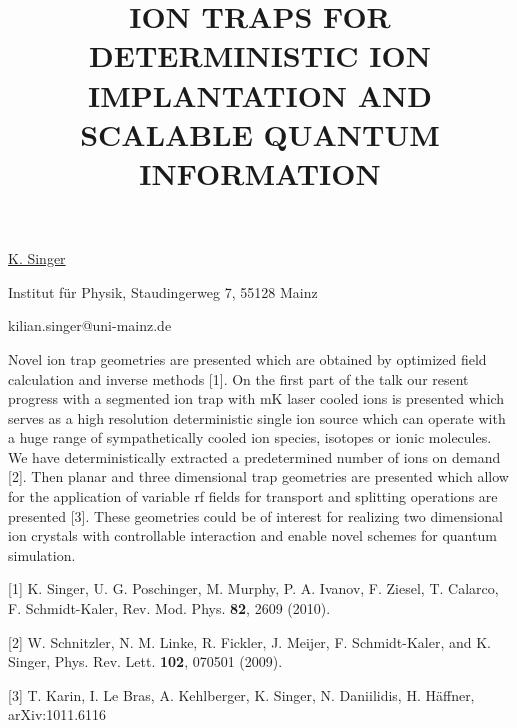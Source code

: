 \title{ION TRAPS FOR DETERMINISTIC ION IMPLANTATION AND SCALABLE QUANTUM INFORMATION}

\underline{K. Singer} 

{\normalsize{\vspace{-4mm}}
Institut f\"{u}r Physik, Staudingerweg 7, 55128 Mainz

\email kilian.singer@uni-mainz.de}

Novel ion trap geometries are presented which are obtained by optimized field calculation and inverse methods [1]. On the first part of the talk our resent progress with a segmented ion trap with mK laser cooled ions is presented which serves as a high resolution deterministic single ion source which can operate with a huge range of sympathetically cooled ion species, isotopes or ionic molecules. We have deterministically extracted a predetermined number of ions on demand [2]. Then planar and three dimensional trap geometries are presented which allow for the application of variable rf fields for transport and splitting operations are presented [3]. These geometries could be of interest for realizing two dimensional ion crystals with controllable interaction and enable novel schemes for quantum simulation.

{\normalsize
[1] K. Singer, U. G. Poschinger, M. Murphy, P. A. Ivanov, F. Ziesel, T. Calarco, F. Schmidt-Kaler, Rev. Mod. Phys. \textbf{82}, 2609 (2010).%
\vsp

[2] W. Schnitzler, N. M. Linke, R. Fickler, J. Meijer, F. Schmidt-Kaler, and K. Singer, Phys. Rev. Lett. \textbf{102}, 070501 (2009).%
\vsp

[3] T. Karin, I. Le Bras, A. Kehlberger, K. Singer, N. Daniilidis, H. H\"{a}ffner, arXiv:1011.6116%
}

\vspace{\baselineskip}
